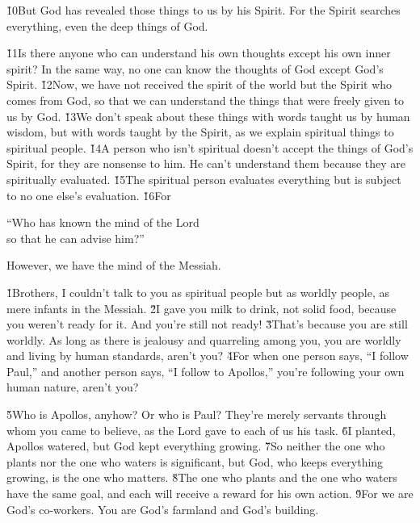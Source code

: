 \v{10}But God has revealed those things to us by his Spirit. For the Spirit searches everything, even the deep things of God.

\v{11}Is there anyone who can understand his own thoughts except his own inner spirit? In the same way, no one can know the thoughts of God except God's Spirit. \v{12}Now, we have not received the spirit of the world but the Spirit who comes from God, so that we can understand the things that were freely given to us by God. \v{13}We don't speak about these things with words taught us by human wisdom, but with words taught by the Spirit, as we explain spiritual things to spiritual people. \v{14}A person who isn't spiritual doesn't accept the things of God's Spirit, for they are nonsense to him. He can't understand them because they are spiritually evaluated. \v{15}The spiritual person evaluates everything but is subject to no one else's evaluation. \v{16}For

\begin{poetry}
\poeml ``Who has known the mind of the Lord \\
\poemll    so that he can advise him?''
\end{poetry}

However, we have the mind of the Messiah.

\v{1}Brothers, I couldn't talk to you as spiritual people but as worldly people, as mere infants in the Messiah. \v{2}I gave you milk to drink, not solid food, because you weren't ready for it. And you're still not ready! \v{3}That's because you are still worldly. As long as there is jealousy and quarreling among you, you are worldly and living by human standards, aren't you? \v{4}For when one person says, ``I follow Paul,'' and another person says, ``I follow to Apollos,'' you're following your own human nature, aren't you?

\v{5}Who is Apollos, anyhow? Or who is Paul? They're merely servants through whom you came to believe, as the Lord gave to each of us his task. \v{6}I planted, Apollos watered, but God kept everything growing. \v{7}So neither the one who plants nor the one who waters is significant, but God, who keeps everything growing, is the one who matters. \v{8}The one who plants and the one who waters have the same goal, and each will receive a reward for his own action. \v{9}For we are God's co-workers. You are God's farmland and God's building.

